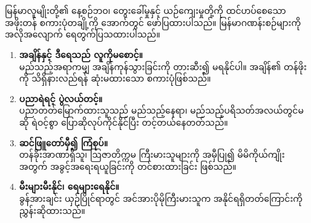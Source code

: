 \documentclass[11pt, a4paper, openany]{book} %
\begin{document}
\chapter{}

\begin{myanmar}
မြန်မာလူမျိုးတို့၏ နေ့စဉ်ဘဝ၊ တွေးခေါ်မှုနှင့် ယဉ်ကျေးမှုတို့ကို ထင်ဟပ်စေသော အဖိုးတန် စကားပုံတချို့ကို အောက်တွင် ဖော်ပြထားပါသည်။ မြန်မာဂဏန်းစဉ်များကို အလိုအလျောက် ရေတွက်ပြသထားပါသည်။
\end{myanmar}

\vspace{1.5em}

\begin{enumerate}
    \renewcommand{\labelenumi}{\textcolor{accentcolor}{\textbf{\textmyanmar{\myanmarnumber{\arabic{enumi}}} \textmyanmar{။}}}}
    
    \item \begin{myanmar}\textbf{အချိန်နှင့် ဒီရေသည် လူကိုမစောင့်။}\\
    မည်သည့်အရာကမျှ အချိန်ကုန်သွားခြင်းကို တားဆီး၍ မရနိုင်ပါ။ အချိန်၏ တန်ဖိုးကို သိရှိနားလည်ရန် ဆုံးမထားသော စကားပုံဖြစ်သည်။\end{myanmar}
    \vspace{1em}
    
    \item \begin{myanmar}\textbf{ပညာရဲရင့် ပွဲလယ်တင့်။}\\
    ပညာတတ်မြောက်ထားသူသည် မည်သည့်နေရာ၊ မည်သည့်ပရိသတ်အလယ်တွင်မဆို ရဲဝင့်စွာ ပြောဆိုလုပ်ကိုင်နိုင်ပြီး တင့်တယ်နေတတ်သည်။\end{myanmar}
    \vspace{1em}
    
    \item \begin{myanmar}\textbf{ဆင်ဖြူတော်မှီ၍ ကြံစုပ်။}\\
    တန်ခိုးအာဏာရှိသူ၊ ဩဇာတိက္ကမ ကြီးမားသူများကို အမှီပြု၍ မိမိကိုယ်ကျိုးအတွက် အခွင့်အရေးရယူခြင်းကို တင်စားထားခြင်း ဖြစ်သည်။\end{myanmar}
    \vspace{1em}
    
    \item \begin{myanmar}\textbf{မီးများမီးနိုင်၊ ရေများရေနိုင်။}\\
    ခွန်အားချင်း ယှဉ်ပြိုင်ရာတွင် အင်အားပိုမိုကြီးမားသူက အနိုင်ရရှိတတ်ကြောင်းကို ညွှန်းဆိုထားသည်။\end{myanmar}
\end{enumerate}
\end{document}
